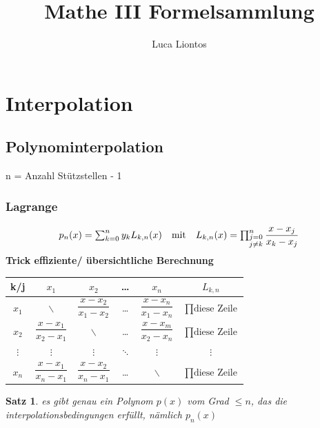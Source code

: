 \documentclass[
	ngerman,
	accentcolor=9c,%
	type=intern,
	marginpar=false
	]{tudapub}
\begin{document}
\newtheorem{satz}{Satz}[section]
\newtheorem{korolar}[satz]{Korolar}
\newtheorem{definition}[satz]{Definition}





\title{Mathe III Formelsammlung}
\author{Luca Liontos}

\maketitle

\tableofcontents
\newpage

\section{Interpolation}
    \subsection{Polynominterpolation}
        n = Anzahl Stützstellen - 1
        \subsubsection{Lagrange}
            \begin{equation*}
                 \begin{array}{l c r}
                             p_n(x) = \sum_{k=0}^n y_k L_{k,n}(x) & \text{mit} & L_{k,n} (x) = \prod_{\substack{j=0 \\ j\not=k}}^n \dfrac{x-x_j}{x_k-x_j}
                \end{array}
            \end{equation*}
            \textbf{Trick effiziente/ übersichtliche Berechnung}\\
            \begin{center}
                \begin{tabular}{c || c | c | c | c | c |}
                    k/j & $x_1$ & $x_2$ & \dots & $x_n$ & $L_{k,n}$\\
                    \hline
                    \hline
                    $x_1$ & $\backslash$ & $\dfrac{x-x_2}{x_1-x_2}$ & \dots & $\dfrac{x-x_n}{x_1-x_n}$ & $\prod\text{diese Zeile}$\\
                    $x_2$ & $\dfrac{x-x_1}{x_2-x_1}$ & $\backslash$ & \dots & $\dfrac{x-x_m}{x_2-x_n}$ & $\prod\text{diese Zeile}$\\
                    $\vdots$ & $\vdots$ & $\vdots$ & $\ddots$ & $\vdots$ & $\vdots$\\ 
                    $x_n$ & $\dfrac{x-x_1}{x_n-x_1}$ & $\dfrac{x-x_2}{x_n-x_1}$ & \dots & $\backslash$ & $\prod\text{diese Zeile}$
                \end{tabular}
            \end{center}
        \begin{satz}
                es gibt genau ein Polynom $p(x)$ vom Grad $\leq n$, das die interpolationsbedingungen erfüllt, nämlich $p_n(x)$
        \end{satz}
\end{document}
